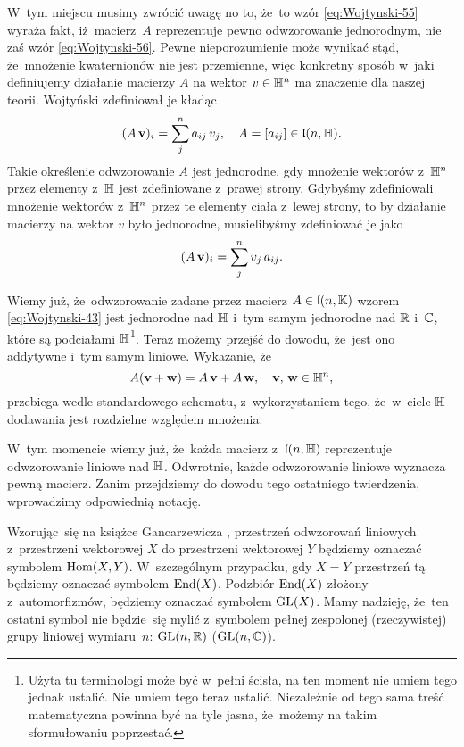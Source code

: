 \documentclass[a4paper,11pt]{article}
\begin{document}
W~tym miejscu musimy zwrócić uwagę no to, że~to wzór \eqref{eq:Wojtynski-55}
wyraża fakt, iż~macierz~$A$ reprezentuje pewno odwzorowanie jednorodnym,
nie zaś wzór \eqref{eq:Wojtynski-56}. Pewne nieporozumienie może wynikać
stąd, że~mnożenie kwaternionów nie jest przemienne, więc konkretny sposób
w~jaki definiujemy działanie macierzy $A$ na wektor $v \in \mathbb{H}^{ n }$ ma
znaczenie dla naszej teorii. Wojtyński zdefiniował je kładąc
\begin{equation}
  \label{eq:Wojtynski-58}
  ( A \, \mathbf{v} )_{ i } = \sum_{ j }^{ n } a_{ i j } \, v_{ j }, \quad
  A = [ a_{ ij } ] \in \mathfrak{l}( n, \mathbb{H} ).
\end{equation}
Takie określenie odwzorowanie $A$ jest jednorodne, gdy mnożenie wektorów
z~$\mathbb{H}^{ n }$ przez elementy z~$\mathbb{H}$ jest zdefiniowane z~prawej strony.
Gdybyśmy zdefiniowali mnożenie wektorów z~$\mathbb{H}^{ n }$ przez te elementy
ciała z~lewej strony, to by działanie macierzy na wektor $v$ było
jednorodne, musielibyśmy zdefiniować je jako
\begin{equation}
  \label{eq:Wojtynski-59}
  ( A \, \mathbf{v} )_{ i } = \sum_{ j }^{ n } v_{ j } \, a_{ i j }.
\end{equation}

Wiemy już, że~odwzorowanie zadane przez macierz $A \in \mathfrak{l}( n, \mathbb{K} )$
wzorem \eqref{eq:Wojtynski-43} jest jednorodne nad $\mathbb{H}$ i~tym samym
jednorodne nad $\mathbb{R}$ i~$\mathbb{C}$, które są podciałami $\mathbb{H}$\footnote{Użyta
  tu terminologi może być w~pełni ścisła, na ten moment nie umiem tego
  jednak ustalić. Nie umiem tego teraz ustalić. Niezależnie od tego sama
  treść matematyczna powinna być na tyle jasna, że~możemy na takim
  sformułowaniu poprzestać.}. Teraz możemy przejść do dowodu, że~jest ono
addytywne i~tym samym liniowe. Wykazanie, że
\begin{equation}
  \label{eq:Wojtynski-60}
  A ( \mathbf{v} + \mathbf{w} ) = A \, \mathbf{v} + A \, \mathbf{w}, \quad
  \mathbf{v}, \, \mathbf{w} \in \mathbb{H}^{ n },
\end{equation}
przebiega wedle standardowego schematu, z~wykorzystaniem tego, że~w~ciele
$\mathbb{H}$ dodawania jest rozdzielne względem mnożenia.

W~tym momencie wiemy już, że~każda macierz z~$\mathfrak{l}( n, \mathbb{H} )$
reprezentuje odwzorowanie liniowe nad $\mathbb{H}$. Odwrotnie, każde odwzorowanie
liniowe wyznacza pewną macierz. Zanim przejdziemy do dowodu tego ostatniego twierdzenia, wprowadzimy odpowiednią notację.

Wzorując~się na książce Gancarzewicza
\cite{GancarzewiczAlgebraLiniowa2004}, przestrzeń odwzorowań liniowych
z~przestrzeni wektorowej $X$ do przestrzeni wektorowej $Y$ będziemy
oznaczać symbolem $\mathrm{Hom}( X, Y )$. W~szczególnym przypadku, gdy $X = Y$
przestrzeń tą będziemy oznaczać symbolem $\mathrm{End}( X )$. Podzbiór $\mathrm{End}( X )$
złożony z~automorfizmów, będziemy oznaczać symbolem $\mathrm{GL}( X )$. Mamy
nadzieję, że~ten ostatni symbol nie będzie~się mylić z~symbolem pełnej
zespolonej (rzeczywistej) grupy liniowej wymiaru~$n$: $\mathrm{GL}( n, \mathbb{R} )$
($\mathrm{GL}( n, \mathbb{C} )$).
\end{document}
